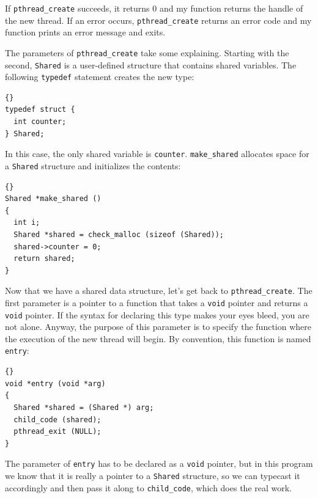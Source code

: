 \documentclass{book}
\begin{document}
If {\tt pthread\_create} succeeds, it returns 0 and my function
returns the handle of the new thread.
If an error occurs, {\tt pthread\_create} 
returns an error code and my function prints an error message
and exits.

The parameters of {\tt pthread\_create} take some
explaining.  Starting with the second,
{\tt Shared}
is a user-defined structure that contains shared variables.
The following {\tt typedef} statement creates the new type:

\begin{latin}
\begin{lstlisting}[title={}]{}
typedef struct {
  int counter;
} Shared;
\end{lstlisting}
\end{latin}

In this case, the only shared variable is {\tt counter}.
{\tt make\_shared} allocates
space for a {\tt Shared} structure and initializes the contents:

\begin{latin}
\begin{lstlisting}[title={}]{}
Shared *make_shared ()
{
  int i;
  Shared *shared = check_malloc (sizeof (Shared));
  shared->counter = 0;
  return shared;
}
\end{lstlisting}
\end{latin}

Now that we have a shared data structure, let's get back to
{\tt pthread\_create}.
The first parameter is a pointer to a function that takes
a {\tt void} pointer and returns a {\tt void} pointer.  If the syntax
for declaring this type makes your eyes bleed, you are not alone.
Anyway, the purpose of this parameter is to specify the function where
the execution of the new thread will begin.  By convention, this
function is named {\tt entry}:

\begin{latin}
\begin{lstlisting}[title={}]{}
void *entry (void *arg)
{
  Shared *shared = (Shared *) arg;
  child_code (shared);
  pthread_exit (NULL);
}
\end{lstlisting}
\end{latin}

The parameter of {\tt entry} has to be declared as a {\tt void}
pointer, but in this program we know that it is really a pointer to a
{\tt Shared} structure, so we can typecast it accordingly and then
pass it along to {\tt child\_code}, which does the real work.
\end{document}

